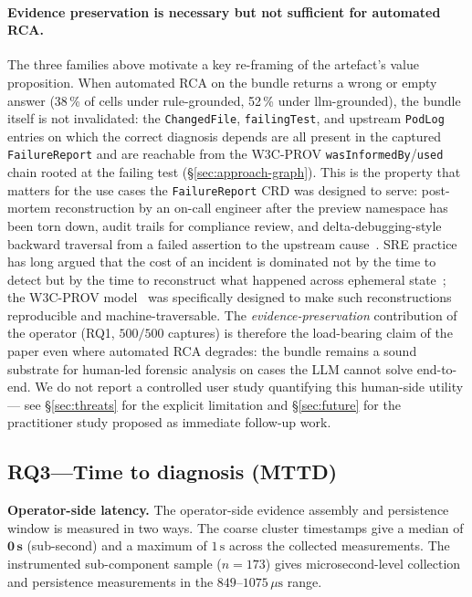 \documentclass[sigconf, nonacm=true, anonymous=false, review=false]{acmart}
\newcommand{\RQ}[1]{RQ#1\xspace}
\begin{document}
\paragraph{Evidence preservation is necessary but not sufficient
for automated RCA.} The three families above motivate a key
re-framing of the artefact's value proposition. When automated
RCA on the bundle returns a wrong or empty answer (38\,\% of
cells under rule-grounded, 52\,\% under llm-grounded), the bundle
itself is not invalidated: the \texttt{ChangedFile},
\texttt{failingTest}, and upstream \texttt{PodLog} entries on
which the correct diagnosis depends are all present in the
captured \texttt{FailureReport} and are reachable from the
W3C-PROV \texttt{wasInformedBy}/\texttt{used} chain rooted at the
failing test (\S\ref{sec:approach-graph}). This is the property that
matters for the use cases the \texttt{FailureReport} CRD was
designed to serve: post-mortem reconstruction by an on-call
engineer after the preview namespace has been torn down,
audit trails for compliance review, and delta-debugging-style
backward traversal from a failed assertion to the upstream
cause~\cite{zeller_delta_2002}. SRE practice has long argued
that the cost of an incident is dominated not by the time to
detect but by the time to reconstruct what happened across
ephemeral state~\cite{beyer_sre_2016, forsgren_accelerate_2018,
bass_devops_2015}; the W3C-PROV
model~\cite{w3c_prov_dm, lebo_provo_2013} was specifically
designed to make such reconstructions reproducible and
machine-traversable. The \emph{evidence-preservation}
contribution of the operator (RQ1, $500/500$ captures) is
therefore the load-bearing claim of the paper even where
automated RCA degrades: the bundle remains a sound substrate
for human-led forensic analysis on cases the LLM cannot solve
end-to-end. We do not report a controlled user study quantifying
this human-side utility — see \S\ref{sec:threats} for the
explicit limitation and \S\ref{sec:future} for the practitioner
study proposed as immediate follow-up work.

\subsection{\RQ{3}---Time to diagnosis (MTTD)}
\label{sec:rq3}

\textbf{Operator-side latency.} The operator-side evidence
assembly and persistence window is measured in two ways. The coarse
cluster timestamps give a median of $\mathbf{0\,\text{s}}$ (sub-second)
and a maximum of $1\,\text{s}$ across the collected measurements. The
instrumented sub-component sample ($n = 173$) gives microsecond-level
collection and persistence measurements in the $849\text{--}1075\,\mu\text{s}$
range.
\end{document}
